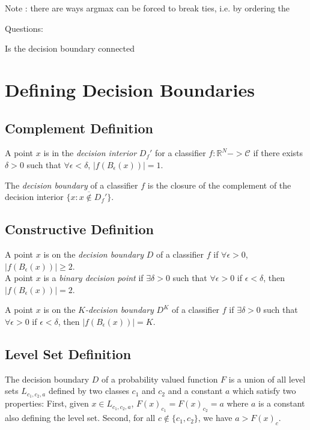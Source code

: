 \documentclass[10pt]{extarticle}
\begin{document}
Note : there are ways argmax can be forced to break ties, i.e. by ordering the 

Questions:

Is the decision boundary connected


\section{Defining Decision Boundaries}

\subsection{Complement Definition}

A point $x$ is in the \emph{decision interior} $D_f'$ for a classifier $f: \mathbb{R}^N -> \mathcal{C}$ if there exists $\delta > 0$ such that $\forall \epsilon < \delta$, $|f(B_\epsilon(x))| = 1$. 

The \emph{decision boundary} of a classifier $f$ is the closure of the complement of the decision interior $\overline{\{x : x \notin D_f'\}}$. 

\subsection{Constructive Definition}

A point $x$ is on the \emph{decision boundary} $D$ of a classifier $f$ if $\forall \epsilon > 0$, $|f(B_\epsilon(x))| \geq 2$.\\

A point $x$ is a \emph{binary decision point} if $\exists \delta > 0$ such that $\forall \epsilon > 0$ if $\epsilon < \delta$, then $|f(B_\epsilon(x))| = 2$. 

A point $x$ is on the \emph{$K$-decision boundary} $D^K$ of a classifier $f$ if $\exists \delta > 0$ such that $\forall \epsilon > 0$ if $\epsilon < \delta$, then $|f(B_\epsilon(x))| = K$. 

\subsection{Level Set Definition}

The decision boundary $D$ of a probability valued function $F$ is a union of all level sets $L_{c_1, c_2, a}$ defined by two classes $c_1$ and $c_2$ and a constant $a$ which satisfy two properties: First, given $x \in L_{c_1, c_2, a}$, $F(x)_{c_1} = F(x)_{c_2} = a$ where $a$ is a constant also defining the level set. Second, for all $c \notin \{c_1, c_2\}$, we have $a > F(x)_c$.   
\end{document}
